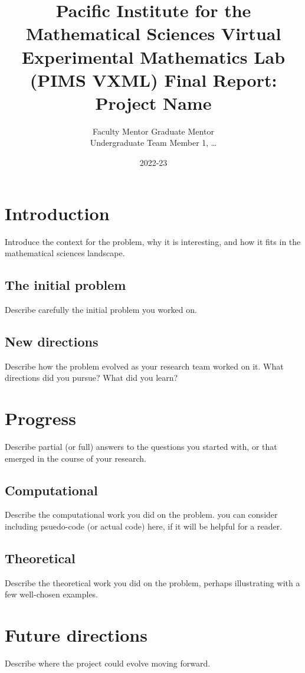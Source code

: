 \documentclass[12pt]{amsart}
\title[PIMS VXML Final Report]{Pacific Institute for the Mathematical Sciences Virtual Experimental Mathematics Lab (PIMS VXML) Final Report: \\ Project Name}
\author[FM, GM, UTM1]{Faculty Mentor Graduate Mentor \\ Undergraduate Team Member 1, \ldots}
\date{2022-23}
\begin{document}
\maketitle
\thispagestyle{fancy}

\section{Introduction}

Introduce the context for the problem, why it is interesting, and how it fits in the mathematical sciences landscape.

\subsection{The initial problem} Describe carefully the initial problem you worked on.

\subsection{New directions} Describe how the problem evolved as your research team worked on it. What directions did you pursue? What did you learn? 


\newpage
\section{Progress}

Describe partial (or full) answers to the questions you started with, or that emerged in the course of your research.

\subsection{Computational} Describe the computational work you did on the problem. you can consider including psuedo-code (or actual code) here, if it will be helpful for a reader.

\subsection{Theoretical} Describe the theoretical work you did on the problem, perhaps illustrating with a few well-chosen examples.

\newpage
\section{Future directions}

Describe where the project could evolve moving forward.

\newpage
\begin{thebibliography}{99}

\end{thebibliography}
\end{document}
